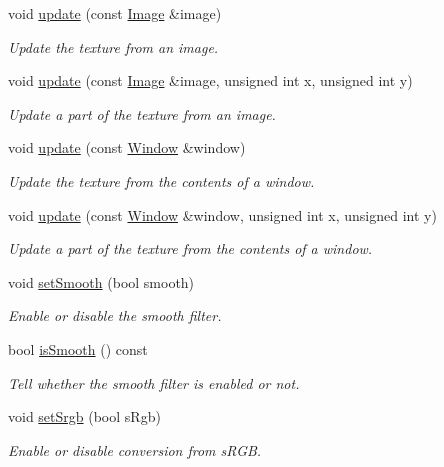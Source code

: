 \begin{DoxyCompactItemize}
void \hyperlink{classsf_1_1_texture_a037cdf171af0fb392d07626a44a4ea17}{update} (const \hyperlink{classsf_1_1_image}{Image} \&image)
\begin{DoxyCompactList}\small\item\em Update the texture from an image. \end{DoxyCompactList}\item 
void \hyperlink{classsf_1_1_texture_a87f916490b757fe900798eedf3abf3ba}{update} (const \hyperlink{classsf_1_1_image}{Image} \&image, unsigned int x, unsigned int y)
\begin{DoxyCompactList}\small\item\em Update a part of the texture from an image. \end{DoxyCompactList}\item 
void \hyperlink{classsf_1_1_texture_ad3cceef238f7d5d2108a98dd38c17fc5}{update} (const \hyperlink{classsf_1_1_window}{Window} \&window)
\begin{DoxyCompactList}\small\item\em Update the texture from the contents of a window. \end{DoxyCompactList}\item 
void \hyperlink{classsf_1_1_texture_a154f246eb8059b602076009ab1cfd175}{update} (const \hyperlink{classsf_1_1_window}{Window} \&window, unsigned int x, unsigned int y)
\begin{DoxyCompactList}\small\item\em Update a part of the texture from the contents of a window. \end{DoxyCompactList}\item 
void \hyperlink{classsf_1_1_texture_a0c3bd6825b9a99714f10d44179d74324}{set\+Smooth} (bool smooth)
\begin{DoxyCompactList}\small\item\em Enable or disable the smooth filter. \end{DoxyCompactList}\item 
bool \hyperlink{classsf_1_1_texture_a3ebb050b5a71e1d40ba66eb1a060e103}{is\+Smooth} () const
\begin{DoxyCompactList}\small\item\em Tell whether the smooth filter is enabled or not. \end{DoxyCompactList}\item 
void \hyperlink{classsf_1_1_texture_af8a38872c50a33ff074bd0865db19dd4}{set\+Srgb} (bool s\+Rgb)
\begin{DoxyCompactList}\small\item\em Enable or disable conversion from s\+R\+GB. \end{DoxyCompactList}\item 

\end{DoxyCompactItemize}
